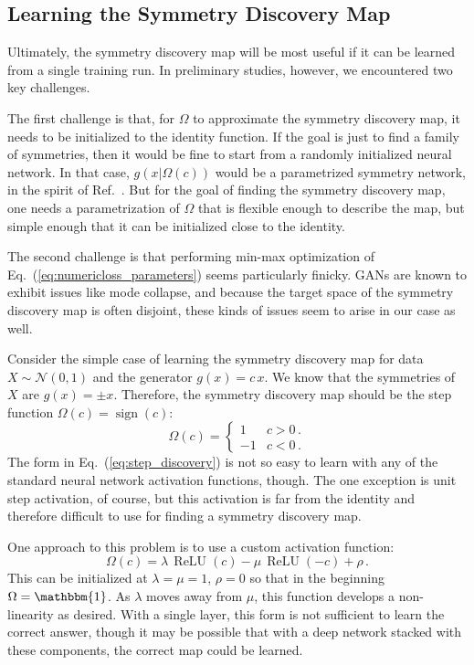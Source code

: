 \documentclass[aps,prx,reprint,preprintnumbers,superscriptaddress,nofootinbib,longbibliography,floatfix]{revtex4-1}
\newcommand{\relu}{\operatorname{ReLU}}
\DeclareRobustCommand{\Eq}[1]{Eq.~(\ref{eq:#1})}
\DeclareRobustCommand{\Ref}[1]{Ref.~\cite{#1}}
\begin{document}
\subsection{Learning the Symmetry Discovery Map}
\label{app:numerics}

Ultimately, the symmetry discovery map will be most useful if it can be learned from a single training run.
%
In preliminary studies, however, we encountered two key challenges.


The first challenge is that, for $\Omega$ to approximate the symmetry discovery map, it needs to be initialized to the identity function.
%
If the goal is just to find a family of symmetries, then it would be fine to start from a randomly initialized neural network.
%
In that case, $g(x|\Omega(c))$ would be a parametrized symmetry network, in the spirit of \Ref{Baldi:2016fzo}.
%
But for the goal of finding the symmetry discovery map, one needs a parametrization of $\Omega$ that is flexible enough to describe the map, but simple enough that it can be initialized close to the identity.


The second challenge is that performing min-max optimization of \Eq{numericloss_parameters} seems particularly finicky.
%
GANs are known to exhibit issues like mode collapse, and because the target space of the symmetry discovery map is often disjoint, these kinds of issues seem to arise in our case as well.


Consider the simple case of learning the symmetry discovery map for data $X\sim\mathcal{N}(0, 1)$ and the generator $g(x) = c\, x$. 
%
We know that the symmetries of $X$ are $g(x) = \pm x$.
%
Therefore, the symmetry discovery map should be the step function $\Omega(c) = \operatorname{sign}(c)$:
%
\begin{equation}
    \label{eq:step_discovery}
    \Omega(c) = \begin{cases}1 & c > 0\, .\\
    -1 & c < 0\,.
    \end{cases}
\end{equation}
%
The form in \Eq{step_discovery} is not so easy to learn with any of the standard neural network activation functions, though.
%
The one exception is unit step activation, of course, but this activation is far from the identity and therefore difficult to use for finding a symmetry discovery map.


One approach to this problem is to use a custom activation function:
%
\begin{equation}
    \Omega(c) = \lambda\,\relu(c) - \mu\,\relu(-c) + \rho\, .
\end{equation} 
%
This can be initialized at $\lambda = \mu = 1$, $\rho = 0$ so that in the beginning $\Omega = \mathbbm{1}$.
%
As $\lambda$ moves away from $\mu$, this function develops a non-linearity as desired.
%
With a single layer, this form is not sufficient to learn the correct answer, though it may be possible that with a deep network stacked with these components, the correct map could be learned.
\end{document}

